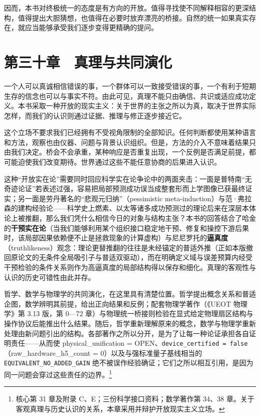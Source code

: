 \documentclass[
  11pt,
  oneside]{book}
\begin{document}
\begingroup{}

因而，本书对终极统一的态度是有方向的开放。值得寻找使不同解释相容的更深结构，值得提出大胆猜想，也值得在必要时放弃漂亮的桥接。自然的统一如果真实存在，就应当能够承受我们逐步变得更精确的提问。

\par\endgroup

\chapter{第三十章　真理与共同演化}\label{ph-ch-30}

一个人可以真诚相信错误的事，一个群体可以一致接受错误的事，一个有利于短期生存的信念也可以与事实不符。由此可见，真理不能只由确信、共识或适应成功定义。本书采取一种开放的现实主义：关于世界的主张之所以为真，取决于世界实际怎样，而我们的认识则通过证据、推理与修正逐步接近它。

这个立场不要求我们已经拥有不受视角限制的全部知识。任何判断都使用某种语言和方法，观察也由仪器、问题与背景认识组织。但是，方法的介入不意味着结果只由我们决定。桥会不会承重，某种响应是否重复出现，一个反例是否满足前提，都可能迫使我们改变期待。世界通过这些不能任意协商的后果进入认识。

这种``开放实在论''需要同时回应科学实在论争论中的两面夹击：一面是普特南``无奇迹论证''若表述过强，容易把局部预测成功误当成整套形而上学图像已获最终证实；另一面是劳丹著名的``悲观元归纳''（pessimistic meta-induction）与范·弗拉森的建构经验论------科学史上燃素、以太等诸多成功预测过的理论后来在深层本体论上被推翻，那么我们凭什么相信今日的对象与结构主张？本书的回答结合了哈金的\textbf{干预实在论}（当我们能够利用某个组织接口稳定地干预、修复和操控下游后果时，该局部因果依赖便不止是拯救现象的计算虚构）与尼尼罗托的\textbf{逼真度}（truthlikeness）观念：理论更替推翻的往往是未经锚定的普适外推（正如本版撤回原论文的无条件全局吸引子与普适双驱动），而在明确定义域与误差预算内经受干预检验的条件关系则作为高逼真度的局部结构得以保存和细化。真理的客观性与认识的历史可错性由此并存。

哲学、数学与物理学的共同演化，在这里具有清楚位置。哲学提出概念关系和普适企图，数学辨明其前提，给出正向结果和反例；配套物理学著作（《UEOT 物理学》第 3.13 版，第 0---72 章）与物理统一桥接则检验在显式给定物理扇区结构与操作协议后能推出什么结果。随后，哲学重新理解原来的概念，数学与物理学重新处理由新问题引出的结构。各部著作之所以分开，是为了让每一种论证承担各自证明责任------从而使 physical\_unification = OPEN、\texttt{device\_certified\ =\ false}（raw\_hardware\_h5\_count = 0）以及与强标准量子基线相当的 \texttt{EQUIVALENT\_NO\_ADDED\_GAIN} 绝不被误作经验确证；它们之所以相互引用，是因为同一问题会穿过这些责任的边界。\footnote{\hypertarget{ph-note-67}{}核心第 31 章及附录 C、E；三份科学接口资料；数学著作第 34、38 章。关于客观真理与历史认识的关系，本章采用并辩护开放现实主义立场。}
\end{document}
